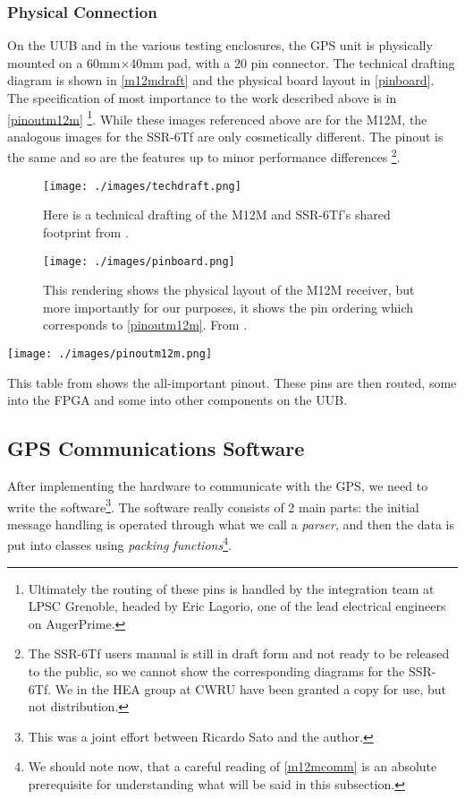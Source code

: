 \subsubsection{Physical Connection}
On the UUB and in the various testing enclosures, the GPS unit is physically mounted on a 60mm$\times$40mm pad, with a 20 pin connector. The technical drafting diagram is shown in \autoref{m12mdraft} and the physical board layout in \autoref{pinboard}. The specification of most importance to the work described above is in \autoref{pinoutm12m} \footnote{Ultimately the routing of these pins is handled by the integration team at LPSC Grenoble, headed by Eric Lagorio, one of the lead electrical engineers on AugerPrime.}. While these images referenced above are for the M12M, the analogous images for the SSR-6Tf are only cosmetically different. The pinout is the same and so are the features up to minor performance differences \footnote{The SSR-6Tf users manual is still in draft form and not ready to be released to the public, so we cannot show the corresponding diagrams for the SSR-6Tf. We in the HEA group at CWRU have been granted a copy for use, but not distribution.}.
\begin{figure}[H]
\centering
\texttt{[image: ./images/techdraft.png]}
\caption[M12M Footprint Technical Draft]{Here is a technical drafting of the M12M and SSR-6Tf's shared footprint from \textcite{m12muser}.}
\label{m12mdraft}
\end{figure}
\begin{figure}[H]
\centering
\texttt{[image: ./images/pinboard.png]}
\caption[M12M Physical Board Layout]{This rendering shows the physical layout of the M12M receiver, but more importantly for our purposes, it shows the pin ordering which corresponds to \autoref{pinoutm12m}. From \textcite{m12muser}.}
\label{pinboard}
\end{figure}
\begin{table}[H]
\centering
\texttt{[image: ./images/pinoutm12m.png]}
\caption[M12M/SSR-6Tf Header Pinout]{This table from \textcite{m12muser} shows the all-important pinout. These pins are then routed, some into the FPGA and some into other components on the UUB.}
\label{pinoutm12m}
\end{table}
\newpage
\subsection{GPS Communications Software}
After implementing the hardware to communicate with the GPS, we need to write the software\footnote{This was a joint effort between Ricardo Sato and the author.}. The software really consists of 2 main parts: the initial message handling is operated through what we call a \textit{parser}, and then the data is put into classes using \textit{packing functions}\footnote{We should note now, that a careful reading of \autoref{m12mcomm} is an absolute prerequisite for understanding what will be said in this subsection.}.


